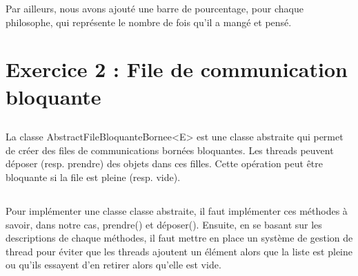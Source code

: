 \documentclass{article}
\begin{document}
Par ailleurs, nous avons ajouté une barre de pourcentage, pour chaque philosophe, qui représente le nombre de fois qu’il a mangé et pensé.


\section{Exercice 2 : File de communication bloquante}
\subsection{}
La classe AbstractFileBloquanteBornee<E> est une classe abstraite qui permet de créer des files de communications bornées bloquantes. Les threads peuvent déposer (resp. prendre) des objets dans ces filles. Cette opération peut être bloquante si la file est pleine (resp. vide).

\subsection{}
Pour implémenter une classe classe abstraite, il faut implémenter ces méthodes à savoir, dans notre cas, prendre() et déposer(). Ensuite, en se basant sur les descriptions de chaque méthodes, il faut mettre en place un système de gestion de thread pour éviter que les threads ajoutent un élément alors que la liste est pleine ou qu’ils essayent d’en retirer alors qu’elle est vide.
\end{document}
